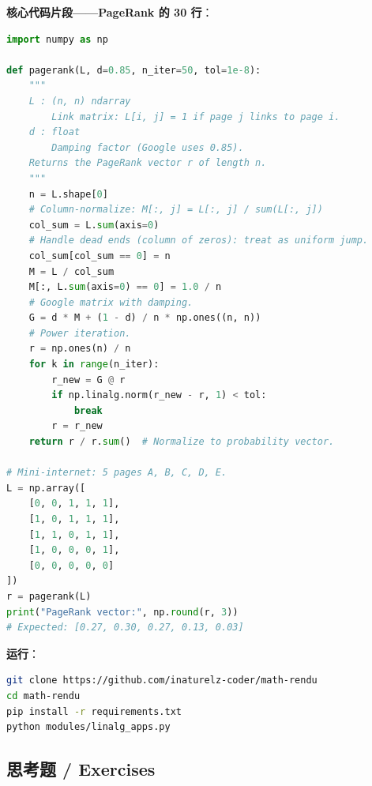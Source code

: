\textbf{核心代码片段——PageRank 的 30 行}：

\begin{lstlisting}[language=Python]
import numpy as np

def pagerank(L, d=0.85, n_iter=50, tol=1e-8):
    """
    L : (n, n) ndarray
        Link matrix: L[i, j] = 1 if page j links to page i.
    d : float
        Damping factor (Google uses 0.85).
    Returns the PageRank vector r of length n.
    """
    n = L.shape[0]
    # Column-normalize: M[:, j] = L[:, j] / sum(L[:, j])
    col_sum = L.sum(axis=0)
    # Handle dead ends (column of zeros): treat as uniform jump.
    col_sum[col_sum == 0] = n
    M = L / col_sum
    M[:, L.sum(axis=0) == 0] = 1.0 / n
    # Google matrix with damping.
    G = d * M + (1 - d) / n * np.ones((n, n))
    # Power iteration.
    r = np.ones(n) / n
    for k in range(n_iter):
        r_new = G @ r
        if np.linalg.norm(r_new - r, 1) < tol:
            break
        r = r_new
    return r / r.sum()  # Normalize to probability vector.

# Mini-internet: 5 pages A, B, C, D, E.
L = np.array([
    [0, 0, 1, 1, 1],
    [1, 0, 1, 1, 1],
    [1, 1, 0, 1, 1],
    [1, 0, 0, 0, 1],
    [0, 0, 0, 0, 0]
])
r = pagerank(L)
print("PageRank vector:", np.round(r, 3))
# Expected: [0.27, 0.30, 0.27, 0.13, 0.03]
\end{lstlisting}

\textbf{运行}：

\begin{lstlisting}[language=bash]
git clone https://github.com/inaturelz-coder/math-rendu
cd math-rendu
pip install -r requirements.txt
python modules/linalg_apps.py
\end{lstlisting}

\subsection{思考题 / Exercises}

